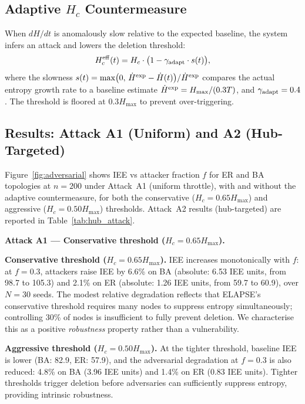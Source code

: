 \documentclass[review,12pt]{elsarticle}
\newcommand{\Hc}{H_c}
\newcommand{\Hmax}{H_{\max}}
\begin{document}
\subsection{Adaptive \texorpdfstring{$H_c$}{Hc} Countermeasure}

When $dH/dt$ is anomalously slow relative to the expected baseline, the
system infers an attack and lowers the deletion threshold:
\begin{equation}
  \Hc^{\rm eff}(t) = \Hc \cdot \bigl(1 - \gamma_{\rm adapt} \cdot s(t)\bigr),
  \label{eq:adaptive_hc}
\end{equation}
where the slowness $s(t) = \max\bigl(0,\, \dot{H}^{\rm exp} - \dot{H}(t)\bigr) / \dot{H}^{\rm exp}$
compares the actual entropy growth rate to a baseline estimate
$\dot{H}^{\rm exp} = \Hmax / (0.3T)$, and $\gamma_{\rm adapt} = 0.4$.
The threshold is floored at $0.3\Hmax$ to prevent over-triggering.

\subsection{Results: Attack A1 (Uniform) and A2 (Hub-Targeted)}
\label{sec:adversarial_results}

Figure~\ref{fig:adversarial} shows IEE vs attacker fraction $f$ for ER
and BA topologies at $n=200$ under Attack~A1 (uniform throttle), with and
without the adaptive countermeasure, for both the conservative
($\Hc = 0.65\Hmax$) and aggressive ($\Hc = 0.50\Hmax$) thresholds.
Attack~A2 results (hub-targeted) are reported in Table~\ref{tab:hub_attack}.

\textbf{Attack A1 --- Conservative threshold ($\Hc = 0.65\Hmax$).}

\textbf{Conservative threshold ($\Hc = 0.65\Hmax$).}
IEE increases monotonically with $f$: at $f=0.3$, attackers raise IEE by
6.6\% on BA (absolute: 6.53 IEE units, from 98.7 to 105.3) and 2.1\% on ER
(absolute: 1.26 IEE units, from 59.7 to 60.9), over $N=30$ seeds.
The modest relative degradation reflects that ELAPSE's conservative threshold
requires many nodes to suppress entropy simultaneously; controlling 30\% of
nodes is insufficient to fully prevent deletion. We characterise this as a
positive \emph{robustness} property rather than a vulnerability.

\textbf{Aggressive threshold ($\Hc = 0.50\Hmax$).}
At the tighter threshold, baseline IEE is lower (BA: 82.9, ER: 57.9),
and the adversarial degradation at $f=0.3$ is also reduced:
4.8\% on BA (3.96 IEE units) and 1.4\% on ER (0.83 IEE units).
Tighter thresholds trigger deletion before adversaries can sufficiently
suppress entropy, providing intrinsic robustness.
\end{document}
